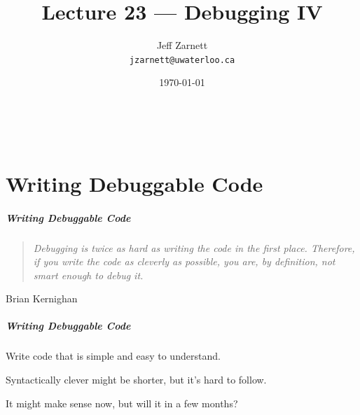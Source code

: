 
\usepackage{alltt}

\title{Lecture 23 --- Debugging IV }

\author{Jeff Zarnett \\ \small \texttt{jzarnett@uwaterloo.ca}}
\date{\today}



\begin{frame}
  \titlepage

  \vfill
  \begin{center}
    \\
                  {\tiny\CcNote{\CcLongnameByNcSa}}
                  \vspace*{-2.5ex}
  \end{center}

\end{frame}

\part{Writing Debuggable Code}
\frame{\partpage}

\begin{frame}
\frametitle{Writing Debuggable Code}
\begin{changemargin}{1cm}


\begin{quote}
	\emph{Debugging is twice as hard as writing the code in the first place. Therefore, if you write the code as cleverly as possible, you are, by definition, not smart enough to debug it.} 
\end{quote}
\hfill Brian Kernighan

\end{changemargin}
\end{frame}

\begin{frame}
\frametitle{Writing Debuggable Code}
\begin{changemargin}{1cm}

Write code that is simple and easy to understand.

Syntactically clever might be shorter, but it's hard to follow.

It might make sense now, but will it in a few months?

\end{changemargin}
\end{frame}


